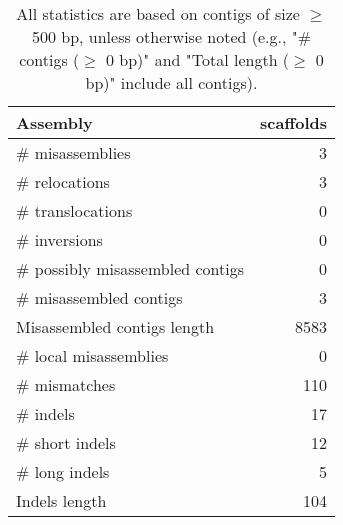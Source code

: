 \documentclass[12pt,a4paper]{article}
\begin{document}
\begin{table}[ht]
\begin{center}
\caption{All statistics are based on contigs of size $\geq$ 500 bp, unless otherwise noted (e.g., "\# contigs ($\geq$ 0 bp)" and "Total length ($\geq$ 0 bp)" include all contigs).}
\begin{tabular}{|l*{1}{|r}|}
\hline
Assembly & scaffolds \\ \hline
\# misassemblies & 3 \\ \hline
\hspace{5mm}\# relocations & 3 \\ \hline
\hspace{5mm}\# translocations & 0 \\ \hline
\hspace{5mm}\# inversions & 0 \\ \hline
\# possibly misassembled contigs & 0 \\ \hline
\# misassembled contigs & 3 \\ \hline
Misassembled contigs length & 8583 \\ \hline
\# local misassemblies & 0 \\ \hline
\# mismatches & 110 \\ \hline
\# indels & 17 \\ \hline
\hspace{5mm}\# short indels & 12 \\ \hline
\hspace{5mm}\# long indels & 5 \\ \hline
Indels length & 104 \\ \hline
\end{tabular}
\end{center}
\end{table}
\end{document}
